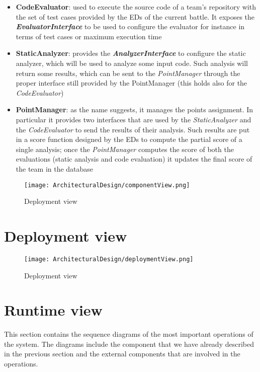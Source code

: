 \begin{itemize}
  \item \textbf{CodeEvaluator}: used to execute the source code of a team's repository with the set of test cases provided by the EDs of the current battle. It exposes the \textbf{\textit{EvaluatorInterface}} to be used to configure the evaluator for instance in terms of test cases or maximum execution time
  \item \textbf{StaticAnalyzer}: provides the \textbf{\textit{AnalyzerInterface}} to configure the static analyzer, which will be used to analyze some input code. Such analysis will return some results, which can be sent to the \textit{PointManager} through the proper interface still provided by the PointManager (this holds also for the \textit{CodeEvaluator})
  \item \textbf{PointManager}: as the name suggests, it manages the points assignment. In particular it provides two interfaces that are used by the \textit{StaticAnalyzer} and the \textit{CodeEvaluator} to send the results of their analysis. Such results are put in a score function designed by the EDs to compute the partial score of a single analysis; once the \textit{PointManager} computes the score of both the evaluations (static analysis and code evaluation) it updates the final score of the team in the database

\end{itemize}

\begin{figure}[H]
    \label{fig:deployment-view}
    \centering
    \texttt{[image: ArchitecturalDesign/componentView.png]}
    \caption{Deployment view}
\end{figure}
\newpage

\section{Deployment view}
\label{s:deployment-view}%

\begin{figure}[H]
    \label{fig:deployment-view}
    \centering
    \texttt{[image: ArchitecturalDesign/deploymentView.png]}
    \caption{Deployment view}
\end{figure}
\newpage

\section{Runtime view}
\label{s:runtime-view}%
This section contains the sequence diagrams of the most important operations of the system. The diagrams include the component that we have already described in the previous section and the external components that are involved in the operations.

